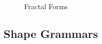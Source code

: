 \begin{figure}[htbp]
	\caption[Fractal Forms]{Fractal Forms \cite{falconer03}}
	\label{Fractal}
\end{figure}

\subsection{Shape Grammars}

